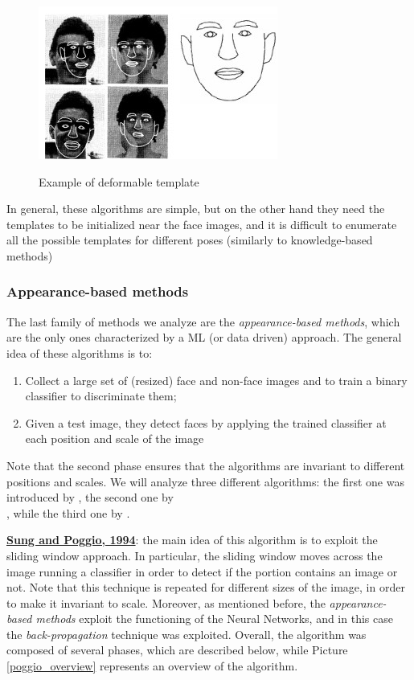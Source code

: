 \begin{figure}[h!]
		\centering
		\includegraphics[scale = 1.5]{img/deformable.jpg}
        \label{deformalble}
        \caption{Example of deformable template}
\end{figure}

In general, these algorithms are simple, but on the other hand they need the templates to be initialized near the face images, and it is difficult to enumerate all the possible templates for different poses (similarly to knowledge-based methods)

\subsubsection{Appearance-based methods}
The last family of methods we analyze are the \textit{appearance-based methods}, which are the only ones characterized by a ML (or data driven) approach. The general idea of these algorithms is to:

\begin{enumerate}
    \item Collect a large set of (resized) face and non-face images and to train a binary classifier to discriminate them;
    \item Given a test image, they detect faces by applying the trained classifier at each position and scale of the image
\end{enumerate}

Note that the second phase ensures that the algorithms are invariant to different positions and scales. We will analyze three different algorithms: the first one was introduced by \cite{sung1998example}, the second one by \\ \cite{rowley1998neural}, while the third one by \cite{viola2001rapid}.

\underline{\textbf{Sung and Poggio, 1994}}: the main idea of this algorithm is to exploit the sliding window approach. In particular, the sliding window moves across the image running a classifier in order to detect if the portion contains an image or not. Note that this technique is repeated for different sizes of the image, in order to make it invariant to scale. Moreover, as mentioned before, the \textit{appearance-based methods} exploit the functioning of the Neural Networks, and in this case the \textit{back-propagation}  technique was exploited. Overall, the algorithm was composed of several phases, which are described below, while Picture \ref{poggio_overview} represents an overview of the algorithm.

